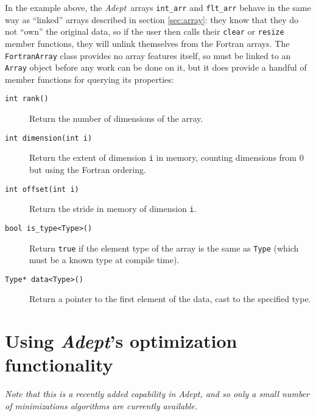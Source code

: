\documentclass[a4,oneside]{book}
\def\codesize{\small}
\def\Adept{\emph{Adept}}
\def\code#1{{\codesize\texttt{#1}}}
\def\citem#1{\item[{\codesize\texttt{#1}}]}
\begin{document}
In the example above, the \Adept\ arrays \code{int\_arr} and
\code{flt\_arr} behave in the same way as ``linked'' arrays described
in section \ref{sec:array}: they know that they do not ``own'' the
original data, so if the user then calls their \code{clear} or
\code{resize} member functions, they will unlink themselves from the
Fortran arrays.  The \code{FortranArray} class provides no array
features itself, so must be linked to an \code{Array} object before
any work can be done on it, but it does provide a handful of member
functions for querying its properties:
\begin{description}
 \citem{int rank()} Return the number of dimensions of the array.
 \citem{int dimension(int i)} Return the extent of dimension \code{i}
 in memory, counting dimensions from 0 but using the Fortran ordering.
 \citem{int offset(int i)} Return the stride in memory of dimension
 \code{i}.
 \citem{bool is\_type<Type>()} Return \code{true} if the element type
 of the array is the same as \code{Type} (which must be a known type at
 compile time).
 \citem{Type* data<Type>()} Return a pointer to the first element of
 the data, cast to the specified type.
\end{description}

\chapter{Using \Adept's optimization functionality}
\label{chap:optimize}

\emph{Note that this is a recently added capability in Adept, and so
  only a small number of minimizations algorithms are currently
  available.}
\end{document}
